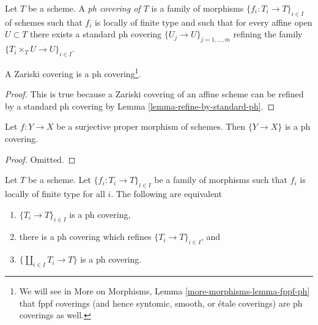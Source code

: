 \begin{definition}
\label{definition-ph-covering}
Let $T$ be a scheme. A {\it ph covering of $T$} is a family
of morphisms $\{f_i : T_i \to T\}_{i \in I}$ of schemes such
that $f_i$ is locally of finite type and such that for every
affine open $U \subset T$ there exists a standard ph covering
$\{U_j \to U\}_{j = 1, \ldots, m}$ refining the family
$\{T_i \times_T U \to U\}_{i \in I}$.
\end{definition}

\begin{lemma}
\label{lemma-zariski-ph}
A Zariski covering is a ph covering\footnote{We will see
in More on Morphisms, Lemma \ref{more-morphisms-lemma-fppf-ph} that
fppf coverings (and hence syntomic, smooth, or \'etale coverings)
are ph coverings as well.}.
\end{lemma}

\begin{proof}
This is true because a Zariski covering of an affine scheme
can be refined by a standard ph covering by
Lemma \ref{lemma-refine-by-standard-ph}.
\end{proof}

\begin{lemma}
\label{lemma-surjective-proper-ph}
Let $f : Y \to X$ be a surjective proper morphism of schemes.
Then $\{Y \to X\}$ is a ph covering.
\end{lemma}

\begin{proof}
Omitted.
\end{proof}

\begin{lemma}
\label{lemma-refine-by-ph}
Let $T$ be a scheme. Let $\{f_i : T_i \to T\}_{i \in I}$ be a family
of morphisms such that $f_i$ is locally of finite type for all $i$.
The following are equivalent
\begin{enumerate}
\item $\{T_i \to T\}_{i \in I}$ is a ph covering,
\item there is a ph covering which refines $\{T_i \to T\}_{i \in I}$, and
\item $\{\coprod_{i \in I} T_i \to T\}$ is a ph covering.
\end{enumerate}
\end{lemma}

